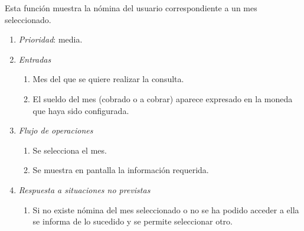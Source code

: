

 \label{fun:consultarnomina}
	Esta función muestra la nómina del usuario correspondiente a un mes seleccionado.

\begin{enumerate}
	\item \textit{Prioridad}: media.
	\item \textit{Entradas}
	\begin{enumerate}
		\item Mes del que se quiere realizar la consulta.
		\item El sueldo del mes (cobrado o a cobrar) aparece expresado en la moneda que haya sido configurada.
	\end{enumerate}
	\item \textit{Flujo de operaciones}
	\begin{enumerate}
		\item Se selecciona el mes.
		\item Se muestra en pantalla la información requerida.
	\end{enumerate}
	\item \textit{Respuesta a situaciones no previstas}
	\begin{enumerate}
		\item Si no existe nómina del mes seleccionado o no se ha podido acceder a ella se informa de lo sucedido y se permite seleccionar otro.
	\end{enumerate}
\end{enumerate}	
